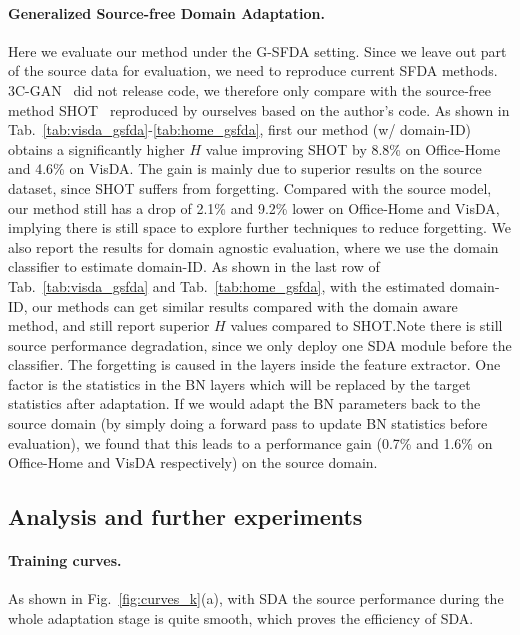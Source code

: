 \documentclass[10pt,twocolumn,letterpaper]{article}
\begin{document}
\paragraph{Generalized Source-free Domain Adaptation.}
Here we evaluate our method under the G-SFDA setting. Since we leave out part of the source data for evaluation, we need to reproduce current SFDA methods. 3C-GAN~\cite{li2020model} did not release code, we therefore only compare with the source-free method SHOT~\cite{liang2020we} reproduced by ourselves based on the author's code.
As shown in Tab.~\ref{tab:visda_gsfda}-\ref{tab:home_gsfda}, first our method (w/ domain-ID) obtains a significantly higher $H$ value improving SHOT by 8.8\% on Office-Home and 4.6\% on VisDA. The gain is mainly due to superior results on the source dataset, since SHOT suffers from forgetting. Compared with the source model, our method still has a drop of 2.1\% and 9.2\% lower on Office-Home and VisDA, implying there is still space to explore further techniques to reduce forgetting. 
We also report the results for domain agnostic evaluation, where we use the domain classifier to estimate domain-ID. As shown in the last row of Tab.~\ref{tab:visda_gsfda} and Tab.~\ref{tab:home_gsfda}, with the estimated domain-ID, our methods can get similar results compared with the domain aware method, and still report superior $H$ values compared to SHOT.{Note there is still source performance degradation, since we only deploy one SDA module before the classifier. The forgetting is caused in the layers inside the feature extractor.
One factor is the statistics in the BN layers which will be replaced by the target statistics after adaptation. If we would adapt the BN parameters back to the source domain (by simply doing a forward pass to update BN statistics before evaluation), we found that this leads to a performance gain (0.7\% and 1.6\% on Office-Home and VisDA respectively) on the source domain.}




\subsection{Analysis and further experiments}

\paragraph{Training curves.} As shown in Fig.~\ref{fig:curves_k}(a), with SDA the source performance during the whole adaptation stage is quite smooth, which proves the efficiency of SDA.
\end{document}
